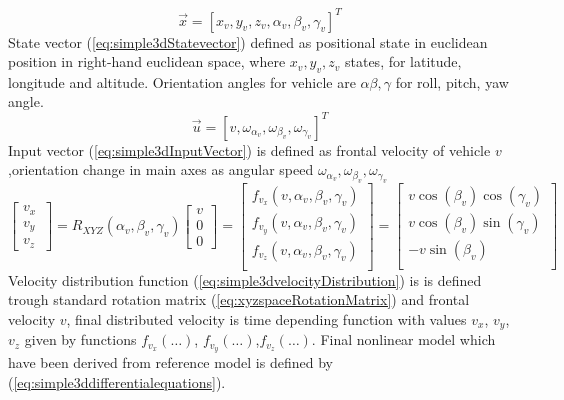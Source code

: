\begin{equation}\label{eq:simple3dStatevector}
    \vec{x} = \left [ x_v,y_v,z_v,\alpha_v,\beta_v,\gamma_v \right ]^T
\end{equation}
State vector (\ref{eq:simple3dStatevector}) defined as positional state in euclidean position in right-hand euclidean space, where $x_v, y_v,z_v$ states, for latitude, longitude and altitude. Orientation angles for vehicle are $\alpha\beta,\gamma$ for roll, pitch, yaw angle.
\begin{equation}\label{eq:simple3dInputVector}
    \vec{u} = \left [ v, \omega_{\alpha_v}, \omega_{\beta_v},\omega_{\gamma_v}\right ]^T
\end{equation}
Input vector (\ref{eq:simple3dInputVector}) is defined as frontal velocity of vehicle $v$,orientation change in main axes as angular speed $\omega_{\alpha_v},\omega_{\beta_v},\omega_{\gamma_v}$
\begin{equation}\label{eq:simple3dvelocityDistribution}
    \begin{bmatrix}
    v_x\\
    v_y\\
    v_z\
    \end{bmatrix}
    = R_{XYZ}(\alpha_v,\beta_v,\gamma_v)
    \begin{bmatrix}
    v\\
    0\\
    0
    \end{bmatrix}
    =
    \begin{bmatrix}
        f_{v_x}(v,\alpha_v,\beta_v,\gamma_v)\\
        f_{v_y}(v,\alpha_v,\beta_v,\gamma_v)\\
        f_{v_z}(v,\alpha_v,\beta_v,\gamma_v)\\
    \end{bmatrix}
    =
    \begin{bmatrix}
         v\cos(\beta_v)\cos(\gamma_v)\\
         v\cos(\beta_v)\sin(\gamma_v)\\
         -v\sin(\beta_v)\\
    \end{bmatrix}
\end{equation}
Velocity distribution function (\ref{eq:simple3dvelocityDistribution}) is is defined trough standard rotation matrix (\ref{eq:xyzspaceRotationMatrix}) and frontal velocity $v$, final distributed velocity is time depending function with values $v_x$, $v_y$, $v_z$ given by functions $f_{v_x}(\dots)$, $f_{v_y}(\dots)$,$f_{v_z}(\dots)$. Final nonlinear model which have been derived from reference model \cite{stevens2015aircraft} is defined by (\ref{eq:simple3ddifferentialequations}).\\
